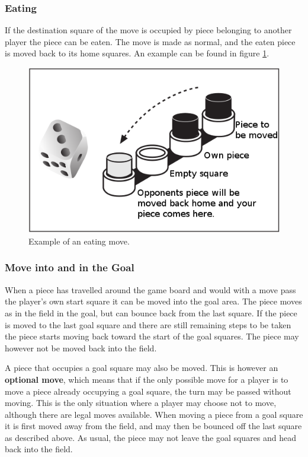 \documentclass[10pt,a4paper]{article}
\begin{document}
\subsubsection{Eating}
\label{sec:eat}

If the destination square of the move is occupied by piece belonging to another player the piece can be eaten. The move is made as normal, and the eaten piece is moved back to its home squares. An example can be found in figure \ref{fig:move-eat}.

\begin{figure}[H]
\begin{center}
\includegraphics[width=.4\linewidth]{move-2.png}
\end{center}
\caption{Example of an eating move.}
\label{fig:move-eat}
\end{figure}

\subsubsection{Move into and in the Goal}

When a piece has travelled around the game board and would with a move pass the player's own start square it can be moved into the goal area. The piece moves as in the field in the goal, but can bounce back from the last square. If the piece is moved to the last goal square and there are still remaining steps to be taken the piece starts moving back toward the start of the goal squares. The piece may however not be moved back into the field.

A piece that occupies a goal square may also be moved. This is however an \textbf{optional move}, which means that if the only possible move for a player is to move a piece already occupying a goal square, the turn may be passed without moving. This is the only situation where a player may choose not to move, although there are legal moves available. When moving a piece from a goal square it is first moved away from the field, and may then be bounced off the last square as described above. As usual, the piece may not leave the goal squares and head back into the field.
\end{document}
